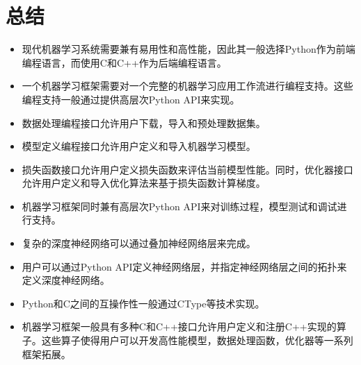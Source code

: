 \documentclass[letterpaper,10pt,english]{sphinxmanual}
\begin{document}
\section{总结}
\label{\detokenize{chapter_programming_interface/summary:id1}}\label{\detokenize{chapter_programming_interface/summary::doc}}\begin{itemize}
\item {} 
\sphinxAtStartPar
现代机器学习系统需要兼有易用性和高性能，因此其一般选择Python作为前端编程语言，而使用C和C++作为后端编程语言。

\item {} 
\sphinxAtStartPar
一个机器学习框架需要对一个完整的机器学习应用工作流进行编程支持。这些编程支持一般通过提供高层次Python
API来实现。

\item {} 
\sphinxAtStartPar
数据处理编程接口允许用户下载，导入和预处理数据集。

\item {} 
\sphinxAtStartPar
模型定义编程接口允许用户定义和导入机器学习模型。

\item {} 
\sphinxAtStartPar
损失函数接口允许用户定义损失函数来评估当前模型性能。同时，优化器接口允许用户定义和导入优化算法来基于损失函数计算梯度。

\item {} 
\sphinxAtStartPar
机器学习框架同时兼有高层次Python
API来对训练过程，模型测试和调试进行支持。

\item {} 
\sphinxAtStartPar
复杂的深度神经网络可以通过叠加神经网络层来完成。

\item {} 
\sphinxAtStartPar
用户可以通过Python
API定义神经网络层，并指定神经网络层之间的拓扑来定义深度神经网络。

\item {} 
\sphinxAtStartPar
Python和C之间的互操作性一般通过CType等技术实现。

\item {} 
\sphinxAtStartPar
机器学习框架一般具有多种C和C++接口允许用户定义和注册C++实现的算子。这些算子使得用户可以开发高性能模型，数据处理函数，优化器等一系列框架拓展。

\end{itemize}
\end{document}
